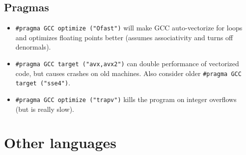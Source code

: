 	\subsection{Pragmas}
			
		\begin{itemize}
			\item \lstinline{#pragma GCC optimize ("Ofast")} will make GCC auto-vectorize for loops and optimizes floating points better (assumes associativity and turns off denormals).
			\item \lstinline{#pragma GCC target ("avx,avx2")} can double performance of vectorized code, but causes crashes on old machines. Also consider older \lstinline{#pragma GCC target ("sse4")}.
			\item \lstinline{#pragma GCC optimize ("trapv")} kills the program on integer overflows (but is really slow).
		\end{itemize}


\section{Other languages}
